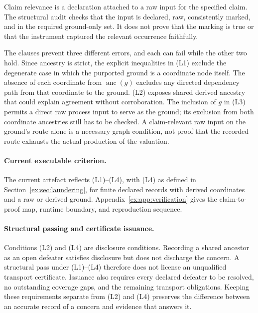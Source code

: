 \documentclass[twocolumn,envcountsect,envcountsame,natbib]{svjour3}
\begin{document}
Claim relevance is a declaration attached to a raw input for the specified claim. The structural audit checks that the input is declared, raw, consistently marked, and in the required ground-only set. It does not prove that the marking is true or that the instrument captured the relevant occurrence faithfully.

The clauses prevent three different errors, and each can fail while the other two hold. Since ancestry is strict, the explicit inequalities in (L1) exclude the degenerate case in which the purported ground is a coordinate node itself. The absence of each coordinate from $\operatorname{anc}(g)$ excludes any directed dependency path from that coordinate to the ground. (L2) exposes shared derived ancestry that could explain agreement without corroboration. The inclusion of $g$ in (L3) permits a direct raw process input to serve as the ground; its exclusion from both coordinate ancestries still has to be checked. A claim-relevant raw input on the ground's route alone is a necessary graph condition, not proof that the recorded route exhausts the actual production of the valuation.

\paragraph{Current executable criterion.} The current artefact reflects (L1)--(L4), with (L4) as defined in Section~\ref{ex:sec:laundering}, for finite declared records with derived coordinates and a raw or derived ground. Appendix~\ref{ex:app:verification} gives the claim-to-proof map, runtime boundary, and reproduction sequence.

\paragraph{Structural passing and certificate issuance.}
Conditions (L2) and (L4) are disclosure conditions. Recording a shared ancestor as an open defeater satisfies disclosure but does not discharge the concern. A structural pass under (L1)--(L4) therefore does not license an unqualified transport certificate. Issuance also requires every declared defeater to be resolved, no outstanding coverage gaps, and the remaining transport obligations. Keeping these requirements separate from (L2) and (L4) preserves the difference between an accurate record of a concern and evidence that answers it.
\end{document}
